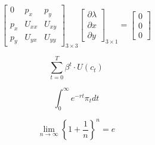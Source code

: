 \documentclass[a4paper,12pt]{article}
\begin{document}
\[
    \begin{bmatrix}
        0   & p_x   & p_y \\
        p_x & U_{xx}    & U_{xy} \\
        p_y & U_{yx}    & U_{yy}
    \end{bmatrix}_{3\times3}
    \begin{bmatrix}
        \partial \lambda \\
         \partial x \\
         \partial y
    \end{bmatrix}_{3\times 1} =
    \begin{bmatrix}
        0 \\
        0 \\
        0
    \end{bmatrix}
\]

$$\sum_{t=0}^{T}\beta^t \cdot U(c_t)$$

$$\int_{0}^{\infty}e^{-rt}\pi_tdt$$

$$\lim_{n \to \infty} \left\{1+\frac{1}{n}\right\}^n=e$$
\end{document}
